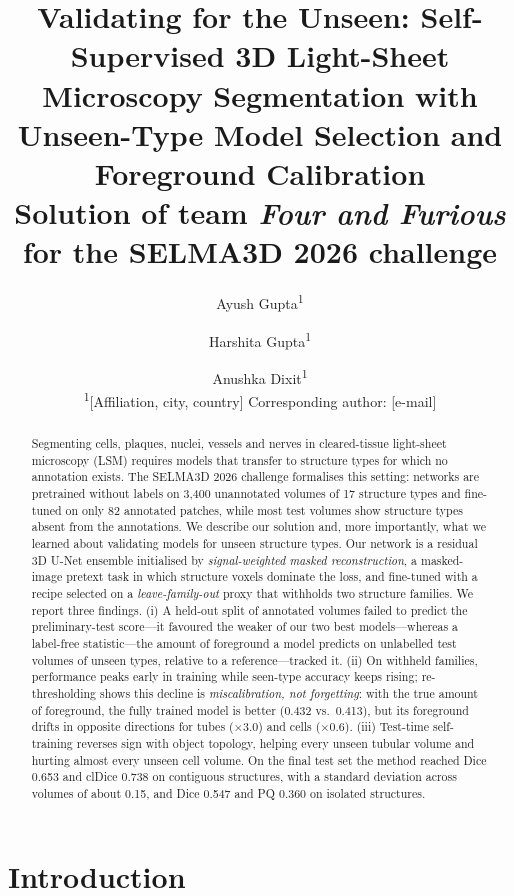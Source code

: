 \documentclass[11pt,a4paper]{article}
\title{\textbf{Validating for the Unseen: Self-Supervised 3D Light-Sheet Microscopy Segmentation with Unseen-Type Model Selection and Foreground Calibration}\\[4pt]
\large Solution of team \emph{Four and Furious} for the SELMA3D 2026 challenge}
\author{Ayush Gupta\textsuperscript{1} \and Harshita Gupta\textsuperscript{1} \and Anushka Dixit\textsuperscript{1}\\[4pt]
\small \textsuperscript{1}[Affiliation, city, country] \quad Corresponding author: [e-mail]}
\date{}
\newcommand{\x}{\ensuremath{\times}}
\begin{document}
\maketitle

\begin{abstract}
Segmenting cells, plaques, nuclei, vessels and nerves in cleared-tissue light-sheet microscopy (LSM) requires models that transfer to structure types for which no annotation exists. The SELMA3D 2026 challenge formalises this setting: networks are pretrained without labels on 3,400 unannotated volumes of 17 structure types and fine-tuned on only 82 annotated patches, while most test volumes show structure types absent from the annotations. We describe our solution and, more importantly, what we learned about validating models for unseen structure types. Our network is a residual 3D U-Net ensemble initialised by \emph{signal-weighted masked reconstruction}, a masked-image pretext task in which structure voxels dominate the loss, and fine-tuned with a recipe selected on a \emph{leave-family-out} proxy that withholds two structure families. We report three findings. (i) A held-out split of annotated volumes failed to predict the preliminary-test score---it favoured the weaker of our two best models---whereas a label-free statistic---the amount of foreground a model predicts on unlabelled test volumes of unseen types, relative to a reference---tracked it. (ii) On withheld families, performance peaks early in training while seen-type accuracy keeps rising; re-thresholding shows this decline is \emph{miscalibration, not forgetting}: with the true amount of foreground, the fully trained model is better (0.432 vs.\ 0.413), but its foreground drifts in opposite directions for tubes (\x3.0) and cells (\x0.6). (iii) Test-time self-training reverses sign with object topology, helping every unseen tubular volume and hurting almost every unseen cell volume. On the final test set the method reached Dice 0.653 and clDice 0.738 on contiguous structures, with a standard deviation across volumes of about 0.15, and Dice 0.547 and PQ 0.360 on isolated structures.
\end{abstract}

\section{Introduction}
\end{document}
